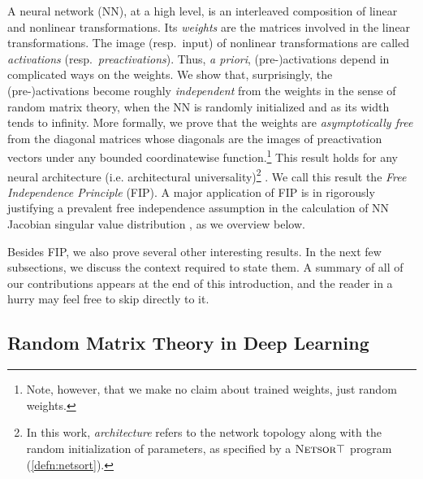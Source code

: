 \documentclass{article}
\theoremstyle{definition}
\theoremstyle{remark}
\newcommand{\trsp}{\top}
\newcommand{\netsort}{\texorpdfstring{{$\textsc{Netsor}\trsp$}}{NetsorT}}
\begin{document}
A neural network (NN), at a high level, is an interleaved composition of linear and nonlinear transformations. Its \emph{weights} are the matrices involved in the linear transformations. The image (resp.\ input) of nonlinear transformations are called \emph{activations} (resp.\ \emph{preactivations}). Thus, \emph{a priori}, (pre-)activations depend in complicated ways on the weights. We show that, surprisingly, the (pre-)activations become roughly \emph{independent} from the weights in the sense of random matrix theory, when the NN is randomly initialized and as its width tends to infinity. More formally, we prove that the weights are \emph{asymptotically free} from the diagonal matrices whose diagonals are the images of preactivation vectors under any bounded coordinatewise function.\footnote{Note, however, that we make no claim about trained weights, just random weights.} This result holds for any neural architecture (i.e. architectural universality)\footnote{In this work, \emph{architecture} refers to the network topology along with the random initialization of parameters, as specified by a \netsort{} program (\cref{defn:netsort}).} . We call this result the \emph{Free Independence Principle} (FIP). A major application of FIP is in rigorously justifying a prevalent free independence assumption in the calculation of NN Jacobian singular value distribution \citep{pennington_resurrecting_2017,pennington_emergence_2018,tarnowski_dynamical_2018,ling_spectrum_2019,xiao_dynamical_2018}, as we overview below. 

Besides FIP, we also prove several other interesting results. In the next few subsections, we discuss the context required to state them. A summary of all of our contributions appears at the end of this introduction, and the reader in a hurry may feel free to skip directly to it.

\subsection{Random Matrix Theory in Deep Learning}
\end{document}
